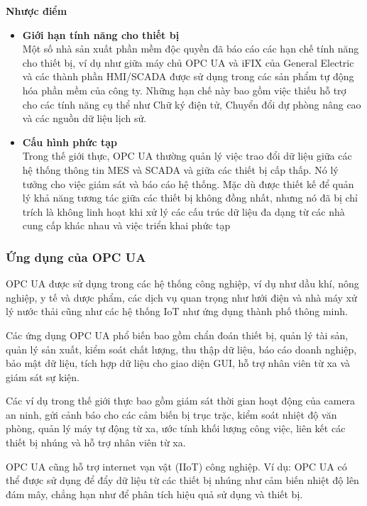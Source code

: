 \textbf{Nhược điểm}

\begin{itemize}
    \item \textbf{Giới hạn tính năng cho thiết bị}\\
    Một số nhà sản xuất phần mềm độc quyền đã báo cáo các hạn chế tính năng cho thiết bị, ví dụ như giữa máy chủ OPC UA và iFIX của General Electric và các thành phần HMI/SCADA được sử dụng trong các sản phẩm tự động hóa phần mềm của công ty. Những hạn chế này bao gồm việc thiếu hỗ trợ cho các tính năng cụ thể như Chữ ký điện tử, Chuyển đổi dự phòng nâng cao và các nguồn dữ liệu lịch sử.
    \item \textbf{Cấu hình phức tạp}\\
    Trong thế giới thực, OPC UA thường quản lý việc trao đổi dữ liệu giữa các hệ thống thông tin MES và SCADA và giữa các thiết bị cấp thấp. Nó lý tưởng cho việc giám sát và báo cáo hệ thống. Mặc dù được thiết kế để quản lý khả năng tương tác giữa các thiết bị không đồng nhất, nhưng nó đã bị chỉ trích là không linh hoạt khi xử lý các cấu trúc dữ liệu đa dạng từ các nhà cung cấp khác nhau và việc triển khai phức tạp
\end{itemize}

\subsubsection{Ứng dụng của OPC UA}

OPC UA được sử dụng trong các hệ thống công nghiệp, ví dụ như dầu khí, nông nghiệp, y tế và dược phẩm, các dịch vụ quan trọng như lưới điện và nhà máy xử lý nước thải cũng như các hệ thống IoT như ứng dụng thành phố thông minh.

Các ứng dụng OPC UA phổ biến bao gồm chẩn đoán thiết bị, quản lý tài sản, quản lý sản xuất, kiểm soát chất lượng, thu thập dữ liệu, báo cáo doanh nghiệp, bảo mật dữ liệu, tích hợp dữ liệu cho giao diện GUI, hỗ trợ nhân viên từ xa và giám sát sự kiện.

Các ví dụ trong thế giới thực bao gồm giám sát thời gian hoạt động của camera an ninh, gửi cảnh báo cho các cảm biến bị trục trặc, kiểm soát nhiệt độ văn phòng, quản lý máy tự động từ xa, ước tính khối lượng công việc, liên kết các thiết bị nhúng và hỗ trợ nhân viên từ xa.

OPC UA cũng hỗ trợ internet vạn vật (IIoT) công nghiệp. Ví dụ: OPC UA có thể được sử dụng để đẩy dữ liệu từ các thiết bị nhúng như cảm biến nhiệt độ lên đám mây, chẳng hạn như để phân tích hiệu quả sử dụng và thiết bị.

